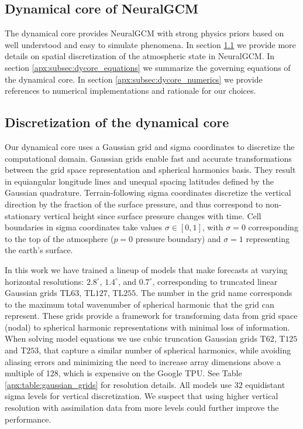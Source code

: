 \documentclass[sn-nature,Numbered]{sn-jnl}%
\begin{document}
\begin{appendices}
\renewcommand{\contentsname}{Appendices}
\setcounter{figure}{4} %

\section{Dynamical core of NeuralGCM}\label{apx:sec:dycore}
The dynamical core provides NeuralGCM with strong physics priors based on well understood and easy to simulate phenomena. In section \ref{apx:subsec:dycore_discretization} we provide more details on spatial discretization of the atmospheric state in NeuralGCM. In section \ref{apx:subsec:dycore_equations} we summarize the governing equations of the dynamical core. In section \ref{apx:subsec:dycore_numerics} we provide references to numerical implementations and rationale for our choices.

\subsection{Discretization of the dynamical core}\label{apx:subsec:dycore_discretization}
Our dynamical core uses a Gaussian grid and sigma coordinates \cite{Bourke1974-spectral} to discretize the computational domain. Gaussian grids enable fast and accurate transformations between the grid space representation and spherical harmonics basis. They result in equiangular longitude lines and unequal spacing latitudes defined by the Gaussian quadrature. Terrain-following sigma coordinates discretize the vertical direction by the fraction of the surface pressure, and thus correspond to non-stationary vertical height since surface pressure changes with time. Cell boundaries in sigma coordinates take values $\sigma \in \left[0,1\right]$, with $\sigma=0$ corresponding to the top of the atmosphere ($p=0$ pressure boundary) and $\sigma=1$ representing the earth's surface.

In this work we have trained a lineup of models that make forecasts at varying horizontal resolutions: $2.8^{\circ}$, $1.4^{\circ}$, and $0.7^{\circ}$, corresponding to truncated linear Gaussian grids TL$63$, TL$127$, TL$255$. The number in the grid name corresponds to the maximum total wavenumber of spherical harmonic that the grid can represent. These grids provide a framework for transforming data from grid space (nodal) to spherical harmonic representations with minimal loss of information. When solving model equations we use cubic truncation Gaussian grids T$62$, T$125$ and T$253$, that capture a similar number of spherical harmonics, while avoiding aliasing errors and minimizing the need to increase array dimensions above a multiple of 128, which is expensive on the Google TPU. See Table \ref{apx:table:gaussian_grids} for resolution details. All models use $32$ equidistant sigma levels for vertical discretization. We suspect that using higher vertical resolution with assimilation data from more levels could further improve the performance.


\end{appendices}
\end{document}
